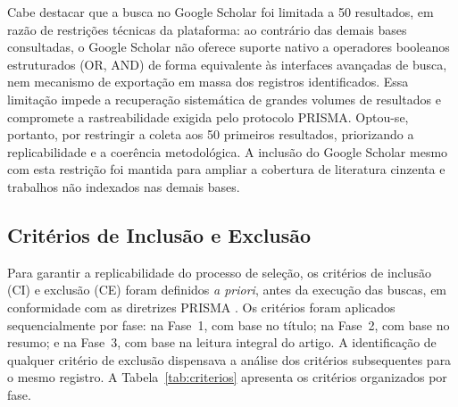 \documentclass[12pt]{article}
\begin{document}
Cabe destacar que a busca no Google Scholar foi limitada a 50 resultados, em razão de restrições técnicas da plataforma: ao contrário das demais bases consultadas, o Google Scholar não oferece suporte nativo a operadores booleanos estruturados (OR, AND) de forma equivalente às interfaces avançadas de busca, nem mecanismo de exportação em massa dos registros identificados. Essa limitação impede a recuperação sistemática de grandes volumes de resultados e compromete a rastreabilidade exigida pelo protocolo PRISMA. Optou-se, portanto, por restringir a coleta aos 50 primeiros resultados, priorizando a replicabilidade e a coerência metodológica. A inclusão do Google Scholar mesmo com esta restrição foi mantida para ampliar a cobertura de literatura cinzenta e trabalhos não indexados nas demais bases.

\subsection{Critérios de Inclusão e Exclusão}\label{subsec:criterios}

Para garantir a replicabilidade do processo de seleção, os critérios de inclusão (CI) e exclusão (CE) foram definidos \textit{a priori}, antes da execução das buscas, em conformidade com as diretrizes PRISMA \cite{Page2021}. Os critérios foram aplicados sequencialmente por fase: na Fase~1, com base no título; na Fase~2, com base no resumo; e na Fase~3, com base na leitura integral do artigo. A identificação de qualquer critério de exclusão dispensava a análise dos critérios subsequentes para o mesmo registro. A Tabela~\ref{tab:criterios} apresenta os critérios organizados por fase.
\end{document}
